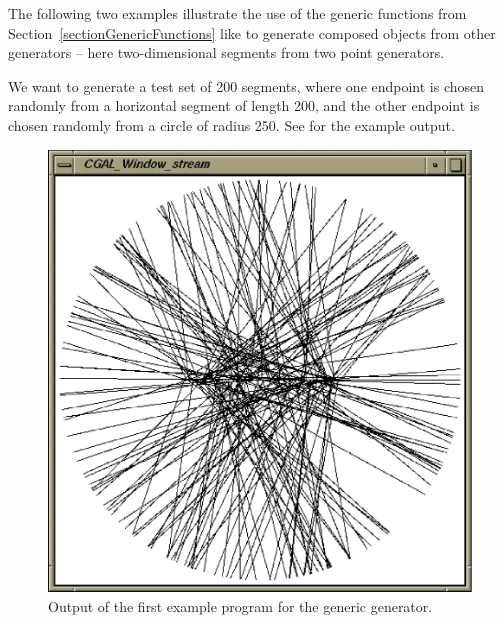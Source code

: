 The following two examples illustrate the use of the generic functions
from Section~\ref{sectionGenericFunctions} like
%
 to generate 
composed objects from other
generators -- here two-dimensional segments from two point generators.

We want to generate a test set of 200 segments, where one endpoint is
chosen randomly from a horizontal segment of length 200, and the other
endpoint is chosen randomly from a circle of radius 250. See
 for the example
output.

\begin{ccTexOnly}
  \begin{figure}
    \noindent
    \hspace*{0.025\textwidth}%
    \begin{minipage}[t]{0.45\textwidth}%
      \includegraphics[width=\textwidth]{Generator/Segment_generator_prog1.ps}
      \caption{Output of the first example program for the generic generator.}
      \label{figureSegmentGenerator}
    \end{minipage}%
    \hspace*{0.05\textwidth}%

\end{figure}
\end{ccTexOnly}
